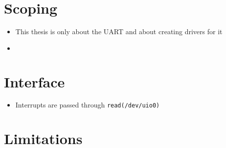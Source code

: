 \documentclass[../main.tex]{subfiles}
\begin{document}
    \clearpage

    \section{Scoping}
    \begin{itemize}
        \item This thesis is only about the UART and about creating drivers for it
        \item
    \end{itemize}

    \section{Interface}
    \begin{itemize}
        \item Interrupts are passed through \texttt{read(/dev/uio0)}
    \end{itemize}

    \section{Limitations}
\end{document}

